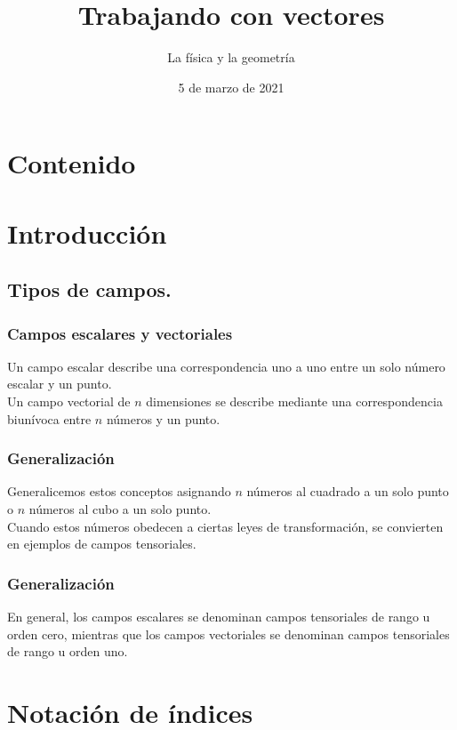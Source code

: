 \documentclass[12pt]{beamer}
\date{5 de marzo de 2021}
\title{Trabajando con vectores}
\subtitle{La física y la geometría}
\begin{document}
\maketitle
\fontsize{14}{14}\selectfont
{}
\section*{Contenido}
\section{Introducción}
\subsection{Tipos de campos.}
\begin{frame}
\frametitle{Campos escalares y vectoriales}
Un campo escalar describe una correspondencia uno a uno entre un solo número escalar y un punto.
\\
\bigskip
\pause
Un campo vectorial de $n$ dimensiones se describe mediante una correspondencia biunívoca entre $n$ números y un punto. 
\end{frame}
\begin{frame}
\frametitle{Generalización}
Generalicemos estos conceptos asignando $n$ números al cuadrado a un solo punto o $n$ números al cubo a un solo punto.
\\
\bigskip
\pause
Cuando estos números obedecen a ciertas leyes de transformación, se convierten en ejemplos de campos tensoriales.
\end{frame}
\begin{frame}
\frametitle{Generalización}
En general, los campos escalares se denominan campos tensoriales de rango u orden cero, mientras que los campos vectoriales se denominan campos tensoriales de rango u orden uno.
\end{frame}
\section{Notación de índices}
\end{document}
